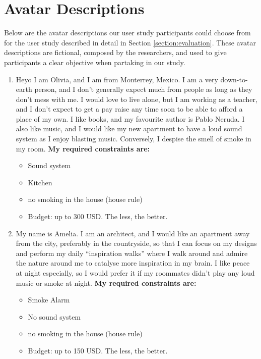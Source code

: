 \appendix

\section{Avatar Descriptions} \label{appendix:avatars}
Below are the avatar descriptions our user study participants could choose from for the user study described in detail in Section \ref{section:evaluation}. These avatar descriptions are fictional, composed by the researchers, and used to give participants a clear objective when partaking in our study. 

\begin{enumerate}
 \item Heyo I am Olivia, and I am from Monterrey, Mexico. I am a very down-to-earth person, and I don’t generally expect much from people as long as they don't mess with me. I would love to live alone, but I am working as a teacher, and I don't expect to get a pay raise any time soon to be able to afford a place of my own. I like books, and my favourite author is Pablo Neruda. I also like music, and I would like my new apartment to have a loud sound system as I enjoy blasting music. Conversely,  I despise the smell of smoke in my room. \textbf{My required constraints are:}
 \begin{itemize}
     \item Sound system
     \item Kitchen
     \item no smoking in the house (house rule)
     \item Budget: up to 300 USD. The less, the better.
 \end{itemize}

\item My name is Amelia. I am an architect, and I would like an apartment away from the city, preferably in the countryside, so that I can focus on my designs and perform my daily “inspiration walks” where I walk around and admire the nature around me to catalyse more inspiration in my brain. I like peace at night especially, so I would prefer it if my roommates didn’t play any loud music or smoke at night. \textbf{My required constraints are:}
\begin{itemize}
    \item Smoke Alarm 
    \item No sound system
    \item no smoking in the house (house rule)
    \item Budget: up to 150 USD. The less, the better.
\end{itemize}



\end{enumerate}
